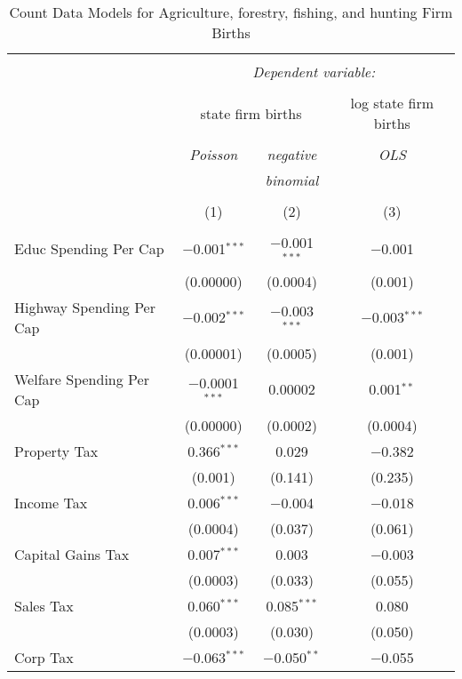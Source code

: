 
\begin{table}[!htbp] \centering 
  \caption{Count Data Models for Agriculture, forestry, fishing, and hunting Firm Births} 
  \label{} 
\begin{tabular}{@{\extracolsep{5pt}}lccc} 
\\[-1.8ex]\hline 
\hline \\[-1.8ex] 
 & \multicolumn{3}{c}{\textit{Dependent variable:}} \\ 
\cline{2-4} 
\\[-1.8ex] & \multicolumn{2}{c}{state firm births} & log state firm births \\ 
\\[-1.8ex] & \textit{Poisson} & \textit{negative} & \textit{OLS} \\ 
 & \textit{} & \textit{binomial} & \textit{} \\ 
\\[-1.8ex] & (1) & (2) & (3)\\ 
\hline \\[-1.8ex] 
 Educ Spending Per Cap & $-$0.001$^{***}$ & $-$0.001$^{***}$ & $-$0.001 \\ 
  & (0.00000) & (0.0004) & (0.001) \\ 
  Highway Spending Per Cap  & $-$0.002$^{***}$ & $-$0.003$^{***}$ & $-$0.003$^{***}$ \\ 
  & (0.00001) & (0.0005) & (0.001) \\ 
  Welfare Spending Per Cap  & $-$0.0001$^{***}$ & 0.00002 & 0.001$^{**}$ \\ 
  & (0.00000) & (0.0002) & (0.0004) \\ 
  Property Tax & 0.366$^{***}$ & 0.029 & $-$0.382 \\ 
  & (0.001) & (0.141) & (0.235) \\ 
  Income Tax & 0.006$^{***}$ & $-$0.004 & $-$0.018 \\ 
  & (0.0004) & (0.037) & (0.061) \\ 
  Capital Gains Tax & 0.007$^{***}$ & 0.003 & $-$0.003 \\ 
  & (0.0003) & (0.033) & (0.055) \\ 
  Sales Tax & 0.060$^{***}$ & 0.085$^{***}$ & 0.080 \\ 
  & (0.0003) & (0.030) & (0.050) \\ 
  Corp Tax & $-$0.063$^{***}$ & $-$0.050$^{**}$ & $-$0.055 \\ 

\end{tabular}
\end{table}
